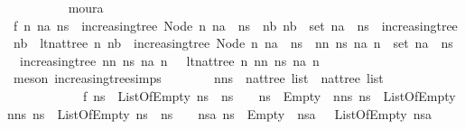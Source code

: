 \begin{isabellebody}
\ \ \ \ \ \ \ \ \isamarkupfalse%
\ moura\isanewline
\ \ \ \ \ \ \isamarkupfalse%
\ \isamarkupfalse%
\ f{}{\isacharcolon}\ {\isachardoublequoteopen}{\isasymforall}n\ na\ ns{\isachardot}\ {\isacharparenleft}{\isasymnot}\ increasing{\isacharunderscore}tree\ {\isacharparenleft}Node\ n\ {\isacharparenleft}na\ {\isacharhash}\ ns{\isacharparenright}{\isacharparenright}\ {\isasymor}\ {\isacharparenleft}{\isasymforall}nb{\isachardot}\ nb\ {\isasymnotin}\ set\ {\isacharparenleft}na\ {\isacharhash}\ ns{\isacharparenright}\ {\isasymor}\ increasing{\isacharunderscore}tree\ nb\ {\isasymand}\ lt{\isacharunderscore}nat{\isacharunderscore}tree\ n\ nb{\isacharparenright}{\isacharparenright}\ {\isasymand}\ {\isacharparenleft}increasing{\isacharunderscore}tree\ {\isacharparenleft}Node\ n\ {\isacharparenleft}na\ {\isacharhash}\ ns{\isacharparenright}{\isacharparenright}\ {\isasymor}\ nn\ ns\ na\ n\ {\isasymin}\ set\ {\isacharparenleft}na\ {\isacharhash}\ ns{\isacharparenright}\ {\isasymand}\ {\isacharparenleft}{\isasymnot}\ increasing{\isacharunderscore}tree\ {\isacharparenleft}nn\ ns\ na\ n{\isacharparenright}\ {\isasymor}\ {\isasymnot}\ lt{\isacharunderscore}nat{\isacharunderscore}tree\ n\ {\isacharparenleft}nn\ ns\ na\ n{\isacharparenright}{\isacharparenright}{\isacharparenright}{\isachardoublequoteclose}\isanewline
\ \ \ \ \ \ \ \ \isamarkupfalse%
\ {\isacharparenleft}meson\ increasing{\isacharunderscore}tree{\isachardot}simps{\isacharparenleft}{}{\isacharparenright}{\isacharparenright}\isanewline
\ \ \ \ \ \ \isamarkupfalse%
\ nns\ {\isacharcolon}{\isacharcolon}\ {\isachardoublequoteopen}nattree\ list\ {\isasymRightarrow}\ nattree\ list{\isachardoublequoteclose}\ \isanewline
\ \ \ \ \ \ \ \ \ \ \ \ f{}{\isacharcolon}\ {\isachardoublequoteopen}{\isasymforall}ns{\isachardot}\ {\isacharparenleft}{\isasymnot}\ ListOfEmpty\ ns\ {\isasymor}\ ns\ {\isacharequal}\ {\isacharbrackleft}{\isacharbrackright}\ {\isasymor}\ ns\ {\isacharequal}\ Empty\ {\isacharhash}\ nns\ ns\ {\isasymand}\ ListOfEmpty\ {\isacharparenleft}nns\ ns{\isacharparenright}{\isacharparenright}\ {\isasymand}\ {\isacharparenleft}ListOfEmpty\ ns\ {\isasymor}\ ns\ {\isasymnoteq}\ {\isacharbrackleft}{\isacharbrackright}\ {\isasymand}\ {\isacharparenleft}{\isasymforall}nsa{\isachardot}\ ns\ {\isasymnoteq}\ Empty\ {\isacharhash}\ nsa\ {\isasymor}\ {\isasymnot}\ ListOfEmpty\ nsa{\isacharparenright}{\isacharparenright}{\isachardoublequoteclose}\isanewline
\ \ \ \ \ \ \ \ \isamarkupfalse%

\end{isabellebody}

